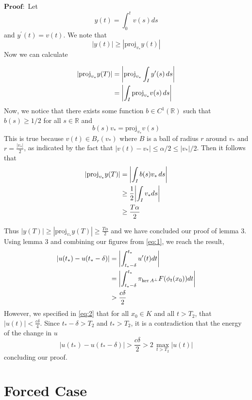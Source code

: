 \documentclass[11pt]{article}
\newcommand{\R}{\mathbb{R}}
\begin{document}
$\mathbf{Proof:}$ Let $$y(t) = \int_{0}^{t}v(s) ds$$ and $y^{\prime}(t) = v(t)$. We note that $$|y(t)| \geq |\text{proj} _{v_*} y(t)|$$ Now we can calculate

\begin{align*}
    |\text{proj}_{v_*} y(T)| & = \abs{\text{proj} _{v_*}\int_I y'(s)\, ds}\\
    & = \abs{\int_I \text{proj} _{v_*}v(s)\, ds}\\
\end{align*}
Now, we notice that there exists some function $b \in C^1(\R)$ such that $b(s) \geq 1/2$ for all $s \in \R$ and $$b(s)v_* = \text{proj} _{v_*}v(s)$$This is true because $v(t) \in B_r(v_*)$ where $B$ is a ball of radius $r$ around $v_*$ and $r = \frac{|v_*|}{2}$, as indicated by the fact that $|v(t) - v_*| \leq \alpha / 2 \leq |v_*|/2$. Then it follows that
\begin{align*}
    |\text{proj}_{v_*} y(T)|& = \abs{\int_I b(s)v_*\, ds} \\
    & \geq \frac{1}{2}\abs{\int _I v_* ds}\\
    & \geq \frac{T\alpha}{2}
\end{align*}

 Thus $|y(T)| \geq |\text{proj}_{v_*} y(T)| \geq \frac{T\alpha}{2}$ and we have concluded our proof of lemma 3.\\

Using lemma 3 and combining our figures from \eqref{eq:1}, we reach the result, 
\begin{align*}
    |u(t_*) - u(t_*  - \delta)| &= \abs{\int _{t_* - \delta} ^{t_*}  u^{\prime}(t)dt}\\
    &=  \abs{\int _{t_* - \delta} ^{t_*}  \pi_{\ker A^{\perp}}F(\phi_{t}(x_0))dt}\\
    &> \frac{c\delta}{2}\\
\end{align*}
However, we specified in \eqref{eq:2} that for all $x_0 \in K$ and all $t > T_2$, that $|u(t)| < \frac{c\delta}{4}$. Since $t_* - \delta > T_2$ and $t_* > T_2$, it is a contradiction that the energy of the change in $u$ $$|u(t_*) - u(t_*  - \delta)| > \frac{c\delta}{2} >  2 \, \underset{t > T_2}{\max}|u(t)|$$concluding our proof.  
~ \\

\section{Forced Case}
\end{document}
